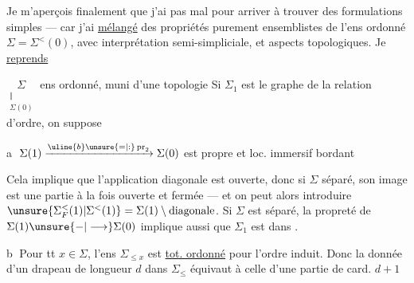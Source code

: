 Je m'aperçois finalement que j'ai
pas mal  pour arriver à trouver des
formulations simples --- car j'ai \uline{mélangé} des
propriétés purement ensemblistes de l'ens ordonné
$\Sigma=\Sigma^{<}(0)$, avec  interprétation semi-simpliciale,
et  aspects topologiques. Je \uline{reprends}

$\underset{\substack{\Vert\\\Sigma(0)}}{\Sigma}$ ens ordonné, muni d'une topologie 
Si $\Sigma_1$ est le graphe de la relation d'ordre, on suppose

\textcircled{a} $\Sigma(1)\xrightarrow{\uline{b}\unsure{=|:}\operatorname{pr}_2}\Sigma(0)$ est propre et loc. immersif bordant
 

 
Cela implique que l'application diagonale est
ouverte, donc si $\Sigma$ séparé, son image est une
partie à la fois ouverte et fermée --- et on
peut alors introduire $\unsure{\Sigma_F^{<}(1)|\Sigma^{<}(1)}=\Sigma(1)\setminus\text{diagonale}$.
Si $\Sigma$ est séparé, la propreté de $\Sigma(1)\unsure{-|\longrightarrow}\Sigma(0)$
implique aussi que $\Sigma_1$ est  dans \inserted{$\Sigma\times\Sigma$}.

\textcircled{b} Pour tt $x\in\Sigma$, l'ens  $\Sigma_{\leq x}$  est \uline{tot. ordonné}
pour l'ordre induit.
 Donc la donnée d'un drapeau  de longueur
$d$ dans $\Sigma_\leq$ équivaut à celle d'une partie de card. $d+1$
